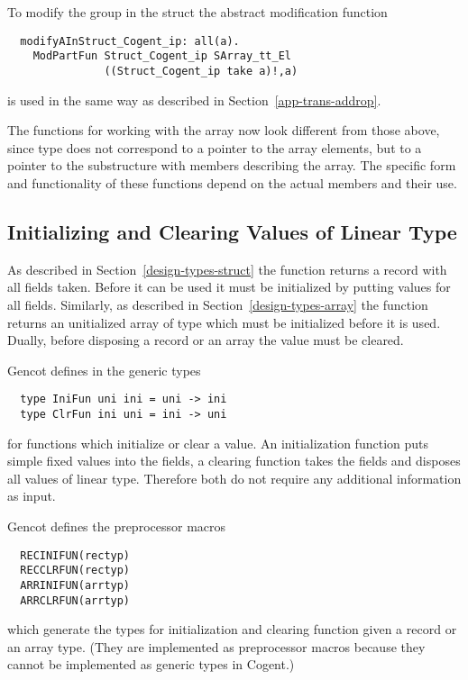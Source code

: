 To modify the group in the struct the abstract modification function 
\begin{verbatim}
  modifyAInStruct_Cogent_ip: all(a). 
    ModPartFun Struct_Cogent_ip SArray_tt_El 
               ((Struct_Cogent_ip take a)!,a)
\end{verbatim}
is used in the same way as described in Section~\ref{app-trans-addrop}.

The functions for working with the array now look different from those above, since type 
does not correspond to a pointer to the array elements, but to a pointer to the substructure with members describing
the array. The specific form and functionality of these functions depend on the actual members and their use.

\subsection{Initializing and Clearing Values of Linear Type}
\label{app-trans-init}

As described in Section~\ref{design-types-struct} the function  returns a record with all fields taken.
Before it can be used it must be initialized by putting values for all fields. Similarly, as described in 
Section~\ref{design-types-array} the function  returns an 
unitialized array of type  which must be initialized before it is used.
Dually, before disposing a record or an array the value must be cleared.

Gencot defines in  the generic types
\begin{verbatim}
  type IniFun uni ini = uni -> ini
  type ClrFun ini uni = ini -> uni
\end{verbatim}
for functions which initialize or clear a value. An initialization function puts simple fixed values into the fields, 
a clearing function takes the fields and disposes all values of linear type. Therefore both do not require any additional 
information as input.

Gencot defines the preprocessor macros
\begin{verbatim}
  RECINIFUN(rectyp)
  RECCLRFUN(rectyp)
  ARRINIFUN(arrtyp)
  ARRCLRFUN(arrtyp)
\end{verbatim}
which generate the types for initialization and clearing function given a record or an array type. (They are implemented 
as preprocessor macros because they cannot be implemented as generic types in Cogent.)

